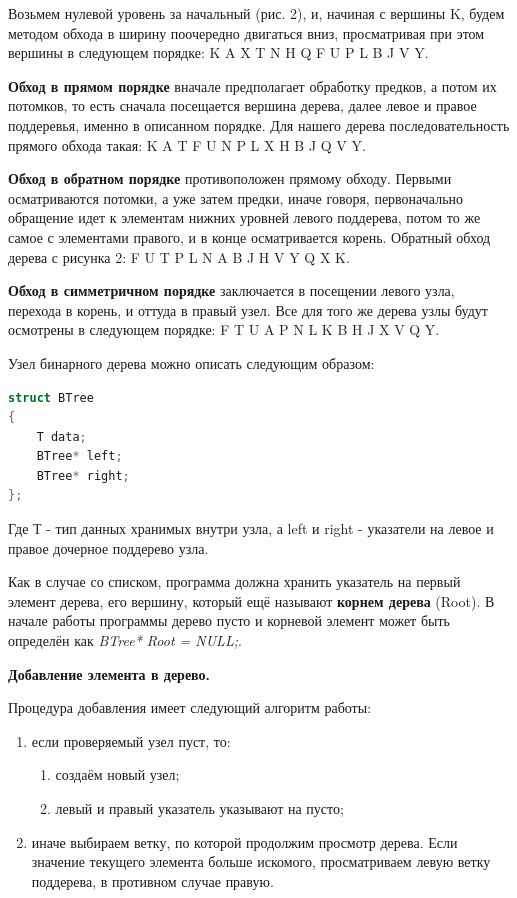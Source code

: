 Возьмем нулевой уровень за начальный (рис. 2), и, начиная с вершины K, будем методом обхода в ширину поочередно двигаться вниз, просматривая при этом вершины в следующем порядке: K A X T N H Q F U P L B J V Y.

{\bf Обход в прямом порядке} вначале предполагает обработку предков, а потом их потомков, то есть сначала посещается вершина дерева, далее левое и правое поддеревья, именно в описанном порядке. Для нашего дерева последовательность прямого обхода такая: K A T F U N P L X H B J Q V Y.

{\bf Обход в обратном порядке} противоположен прямому обходу. Первыми осматриваются потомки, а уже затем предки, иначе говоря, первоначально обращение идет к элементам нижних уровней левого поддерева, потом то же самое с элементами правого, и в конце осматривается корень. Обратный обход дерева с рисунка 2: F U T P L N A B J H V Y Q X K.

{\bf Обход в симметричном порядке} заключается в посещении левого узла, перехода в корень, и оттуда в правый узел. Все для того же дерева узлы будут осмотрены в следующем порядке: F T U A P N L K B H J X V Q Y.

Узел бинарного дерева можно описать следующим образом:
\begin{lstlisting}[language=C++, caption="Описание узла бинарного дерева на С++"]
struct BTree
{
	T data;
	BTree* left;
	BTree* right;
};
\end{lstlisting}

Где Т - тип данных хранимых внутри узла, а left и right - указатели на левое и правое дочерное поддерево узла.

Как в случае со списком, программа должна хранить указатель на первый элемент дерева, его вершину, который ещё называют {\bf корнем дерева} (Root). В начале работы программы дерево пусто и корневой элемент может быть определён как {\it BTree* Root = NULL;}.

{\bf Добавление элемента в дерево.}

Процедура добавления имеет следующий алгоритм работы:
\begin{enumerate}
\item если проверяемый узел пуст, то:
\begin{enumerate}
\item создаём новый узел;
\item левый и правый указатель указывают на пусто;
\end{enumerate}
\item иначе выбираем ветку, по которой продолжим просмотр дерева. Если значение текущего элемента больше искомого, просматриваем левую ветку поддерева, в противном случае правую.
\end{enumerate}

